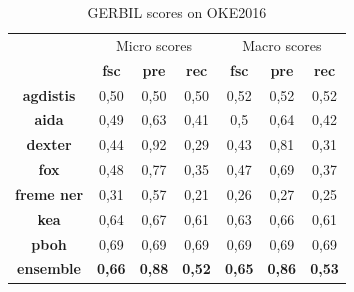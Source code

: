 \documentclass{llncs}
\begin{document}
\begin{table}
      \centering
      \setlength{\tabcolsep}{12pt}
        \begin{tabular}{c|c|c|c|c|c|c|}
          \multicolumn{1}{c}{ } &
          \multicolumn{3}{|c|}{Micro scores} & 
          \multicolumn{3}{|c|}{Macro scores} \\
           \multicolumn{1}{c|}{ } & \textbf{fsc} & \textbf{pre} & \textbf{rec}
           & \textbf{fsc} & \textbf{pre} & \textbf{rec} \\ \hline
            \textbf{agdistis}         & 0,50  & 0,50   & 0,50  &  0,52  & 0,52   & 0,52  \\ \hline
            \textbf{aida}         & 0,49  & 0,63   & 0,41  &   0,5  & 0,64   & 0,42   \\ \hline
            \textbf{dexter}         & 0,44  & 0,92   & 0,29  &   0,43  & 0,81   & 0,31   \\ \hline
            \textbf{fox}         & 0,48  & 0,77   & 0,35  & 0,47  & 0,69   & 0,37   \\ \hline
            \textbf{freme ner}         & 0,31  & 0,57   & 0,21  &   0,26  & 0,27   & 0,25   \\ \hline
            \textbf{kea}         & 0,64  & 0,67   & 0,61  &   0,63  & 0,66   & 0,61  \\ \hline
            \textbf{pboh}         & 0,69  & 0,69   & 0,69  &   0,69  & 0,69   & 0,69   \\ \hline \hline
            \textbf{ensemble}        & \textbf{0,66}   & \textbf{0,88}   & \textbf{0,52} & \textbf{0,65}   & \textbf{0,86}   & \textbf{0,53}  \\ \hline
        \end{tabular}
    \caption{GERBIL scores on OKE2016}
    \label{linkscoresgerbiloke2016}
\end{table}




 
\end{document}
